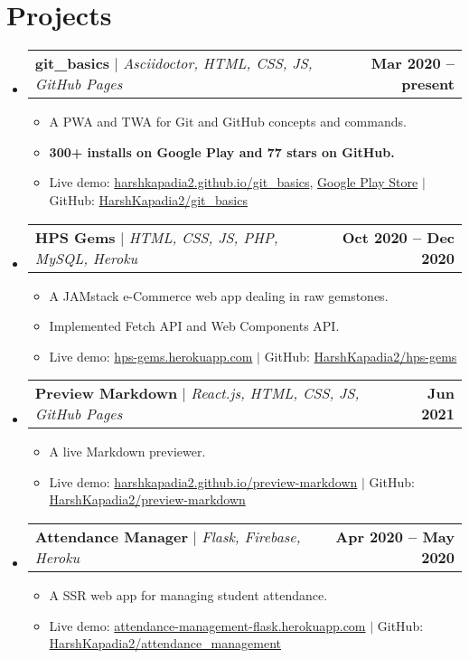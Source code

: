 \documentclass[letterpaper,11pt]{article}
\makeatletter
\newcommand{\resumeItem}[1]{
  \item\small{
    {#1 \vspace{-2pt}}
  }
}
\newcommand{\resumeProjectHeading}[2]{
    \item
    \begin{tabular*}{1.001\textwidth}{l@{\extracolsep{\fill}}r}
      \small#1 & \textbf{\small #2}\\
    \end{tabular*}\vspace{-7pt}
}
\newcommand{\resumeSubHeadingListStart}{\begin{itemize}[leftmargin=0.0in, label={}]}
\newcommand{\resumeSubHeadingListEnd}{\end{itemize}}
\newcommand{\resumeItemListStart}{\begin{itemize}}
\newcommand{\resumeItemListEnd}{\end{itemize}\vspace{-5pt}}
\makeatother
\begin{document}
\section{Projects}
    \vspace{-5pt}
    \resumeSubHeadingListStart
        \resumeProjectHeading
            {\textbf{git\_basics} $|$ \emph{Asciidoctor, HTML, CSS, JS, GitHub Pages}}{Mar 2020 -- present}
            \resumeItemListStart
                \resumeItem{A PWA and TWA for Git and GitHub concepts and commands.}
                \resumeItem{\textbf{300+ installs on Google Play and 77 stars on GitHub.}}
                \resumeItem{Live demo: \href{https://harshkapadia2.github.io/git_basics/}{harshkapadia2.github.io/git\_basics}, \href{https://play.google.com/store/apps/details?id=com.harsh_kapadia.git_basics}{Google Play Store} $|$ GitHub: \href{https://github.com/HarshKapadia2/git_basics}{HarshKapadia2/git\_basics}}
            \resumeItemListEnd
        \vspace{-13pt}

        \resumeProjectHeading
            {\textbf{HPS Gems} $|$ \emph{HTML, CSS, JS, PHP, MySQL, Heroku}}{Oct 2020 -- Dec 2020}
            \resumeItemListStart
                \resumeItem{A JAMstack e-Commerce web app dealing in raw gemstones.}
                \resumeItem{Implemented Fetch API and Web Components API.}
                \resumeItem{Live demo: \href{https://hps-gems.herokuapp.com/}{hps-gems.herokuapp.com} $|$ GitHub: \href{https://github.com/HarshKapadia2/hps-gems}{HarshKapadia2/hps-gems}}
            \resumeItemListEnd
        \vspace{-13pt}
    
        \resumeProjectHeading
            {\textbf{Preview Markdown} $|$ \emph{React.js, HTML, CSS, JS, GitHub Pages}}{Jun 2021}
            \resumeItemListStart
                \resumeItem{A live Markdown previewer.}
                \resumeItem{Live demo: \href{https://harshkapadia2.github.io/preview-markdown/}{harshkapadia2.github.io/preview-markdown} $|$ GitHub: \href{https://github.com/HarshKapadia2/preview-markdown}{HarshKapadia2/preview-markdown}}
            \resumeItemListEnd
        \vspace{-13pt}

        \resumeProjectHeading
            {\textbf{Attendance Manager} $|$ \emph{Flask, Firebase, Heroku}}{Apr 2020 -- May 2020}
            \resumeItemListStart
                \resumeItem{A SSR web app for managing student attendance.}
                \resumeItem{Live demo: \href{https://attendance-management-flask.herokuapp.com/}{attendance-management-flask.herokuapp.com} $|$ GitHub: \href{https://github.com/HarshKapadia2/attendance_management}{HarshKapadia2/attendance\_management}}
            \resumeItemListEnd
    \resumeSubHeadingListEnd
\vspace{-15pt}
\end{document}
